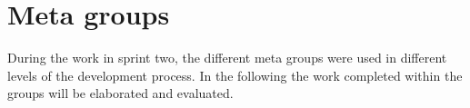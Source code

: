 \section{Meta groups}
During the work in sprint two, the different meta groups were used in different levels of the development process. 
In the following the work completed within the groups will be elaborated and evaluated.





